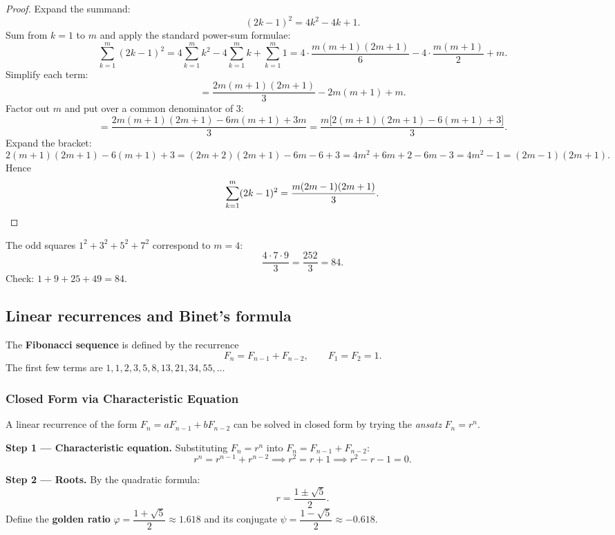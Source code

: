 \begin{proof}
Expand the summand:
\[
(2k-1)^2 = 4k^2 - 4k + 1.
\]
Sum from $k=1$ to $m$ and apply the standard power-sum formulae:
\[
\sum_{k=1}^{m}(2k-1)^{2}
= 4\sum_{k=1}^{m}k^{2} - 4\sum_{k=1}^{m}k + \sum_{k=1}^{m}1
= 4\cdot\frac{m(m+1)(2m+1)}{6} - 4\cdot\frac{m(m+1)}{2} + m.
\]
Simplify each term:
\[
= \frac{2m(m+1)(2m+1)}{3} - 2m(m+1) + m.
\]
Factor out $m$ and put over a common denominator of 3:
\[
= \frac{2m(m+1)(2m+1) - 6m(m+1) + 3m}{3}
= \frac{m\bigl[2(m+1)(2m+1) - 6(m+1) + 3\bigr]}{3}.
\]
Expand the bracket:
\[
2(m+1)(2m+1) - 6(m+1) + 3 = (2m+2)(2m+1) - 6m - 6 + 3
= 4m^2 + 6m + 2 - 6m - 3 = 4m^2 - 1 = (2m-1)(2m+1).
\]
Hence
\[
\sum_{k=1}^{m}(2k-1)^{2} = \frac{m(2m-1)(2m+1)}{3}. \qedhere
\]
\end{proof}

\begin{example}
The odd squares $1^2 + 3^2 + 5^2 + 7^2$ correspond to $m=4$:
\[
\frac{4 \cdot 7 \cdot 9}{3} = \frac{252}{3} = 84.
\]
Check: $1 + 9 + 25 + 49 = 84$. \checkmark
\end{example}

\subsection{Linear recurrences and Binet's formula}

\begin{definition}
The \textbf{Fibonacci sequence} is defined by the recurrence
\[
F_n = F_{n-1} + F_{n-2}, \qquad F_1 = F_2 = 1.
\]
The first few terms are $1, 1, 2, 3, 5, 8, 13, 21, 34, 55, \ldots$
\end{definition}

\subsubsection*{Closed Form via Characteristic Equation}

A linear recurrence of the form $F_n = aF_{n-1} + bF_{n-2}$ can be solved in closed form by trying the \emph{ansatz} $F_n = r^n$.

\textbf{Step 1 — Characteristic equation.} Substituting $F_n = r^n$ into $F_n = F_{n-1} + F_{n-2}$:
\[
r^n = r^{n-1} + r^{n-2} \implies r^2 = r + 1 \implies r^2 - r - 1 = 0.
\]

\textbf{Step 2 — Roots.} By the quadratic formula:
\[
r = \frac{1 \pm \sqrt{5}}{2}.
\]
Define the \textbf{golden ratio} $\varphi = \dfrac{1+\sqrt{5}}{2} \approx 1.618$ and its conjugate $\psi = \dfrac{1-\sqrt{5}}{2} \approx -0.618$.


